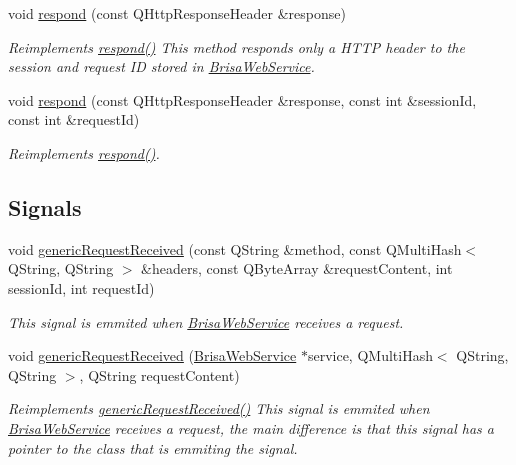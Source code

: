 \begin{DoxyCompactItemize}
void \hyperlink{classBrisaCore_1_1BrisaWebService_a54a5f8ab170bc1e5f97cac6f508deb50}{respond} (const QHttpResponseHeader \&response)
\begin{DoxyCompactList}\small\item\em Reimplements \hyperlink{classBrisaCore_1_1BrisaWebService_a4065f685234edf9f4c1bda00549060c7}{respond()} This method responds only a HTTP header to the session and request ID stored in \hyperlink{classBrisaCore_1_1BrisaWebService}{BrisaWebService}. \item\end{DoxyCompactList}\item 
void \hyperlink{classBrisaCore_1_1BrisaWebService_aa1cead2f4057de3dda2eb0e5dbc6efe2}{respond} (const QHttpResponseHeader \&response, const int \&sessionId, const int \&requestId)
\begin{DoxyCompactList}\small\item\em Reimplements \hyperlink{classBrisaCore_1_1BrisaWebService_a4065f685234edf9f4c1bda00549060c7}{respond()}. \item\end{DoxyCompactList}\end{DoxyCompactItemize}
\subsection*{Signals}
\begin{DoxyCompactItemize}
\item 
void \hyperlink{classBrisaCore_1_1BrisaWebService_ad94a4a9cd45a90dc56559ac86728c61b}{genericRequestReceived} (const QString \&method, const QMultiHash$<$ QString, QString $>$ \&headers, const QByteArray \&requestContent, int sessionId, int requestId)
\begin{DoxyCompactList}\small\item\em This signal is emmited when \hyperlink{classBrisaCore_1_1BrisaWebService}{BrisaWebService} receives a request. \item\end{DoxyCompactList}\item 
void \hyperlink{classBrisaCore_1_1BrisaWebService_a64f1eecefc1c36442dfa1fc63e4e4222}{genericRequestReceived} (\hyperlink{classBrisaCore_1_1BrisaWebService}{BrisaWebService} $\ast$service, QMultiHash$<$ QString, QString $>$, QString requestContent)
\begin{DoxyCompactList}\small\item\em Reimplements \hyperlink{classBrisaCore_1_1BrisaWebService_ad94a4a9cd45a90dc56559ac86728c61b}{genericRequestReceived()} This signal is emmited when \hyperlink{classBrisaCore_1_1BrisaWebService}{BrisaWebService} receives a request, the main difference is that this signal has a pointer to the class that is emmiting the signal. \item\end{DoxyCompactList}\end{DoxyCompactItemize}
